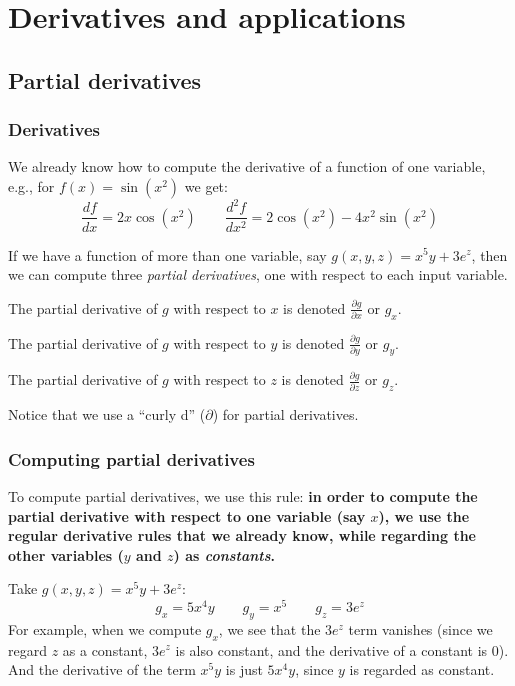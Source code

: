 \section{Derivatives and applications}
\subsection{Partial derivatives}

\begin{frame}
\frametitle{Derivatives}

We already know how to compute the derivative of a function of one variable, e.g., for $f(x)=\sin(x^2)$ we get:
\[\frac{d f}{dx}=2x\cos(x^2) \qquad \frac{d^2 f}{dx^2}=2\cos(x^2)-4x^2\sin(x^2)\]

\pause If we have a function of more than one variable, say $g(x,y,z)=x^5y+3e^z$, then we can compute three \textit{partial derivatives}, one with respect to each input variable.

\pause The partial derivative of $g$ with respect to $x$ is denoted $\frac{\partial g}{\partial x}$ or $g_x$.

The partial derivative of $g$ with respect to $y$ is denoted $\frac{\partial g}{\partial y}$ or $g_y$.

The partial derivative of $g$ with respect to $z$ is denoted $\frac{\partial g}{\partial z}$ or $g_z$.

\pause Notice that we use a ``curly d'' ($\partial$) for partial derivatives.

\end{frame}

\begin{frame}
\frametitle{Computing partial derivatives}

To compute partial derivatives, we use this rule: \textbf{in order to compute the partial derivative with respect to one variable (say $x$), we use the regular derivative rules that we already know, while regarding the other variables ($y$ and $z$) as \textit{constants}.}

\pause \vspace{3mm}Take $g(x,y,z)=x^5y+3e^z$:
\[g_x = 5x^4y\qquad g_y=x^5\qquad g_z=3e^z\]
For example, when we compute $g_x$, we see that the $3e^z$ term vanishes (since we regard $z$ as a constant, $3e^z$ is also constant, and the derivative of a constant is $0$). And the derivative of the term $x^5y$ is just $5x^4y$, since $y$ is regarded as constant.

\end{frame}

